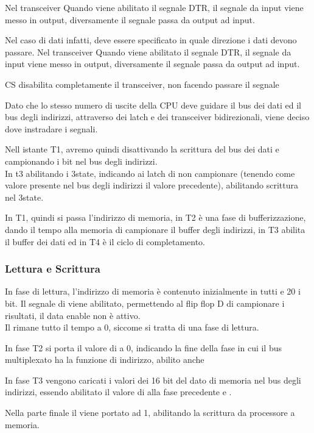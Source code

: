 \documentclass[../template]{subfiles}
\begin{document}
Nel transceiver Quando viene abilitato il segnale DTR, il segnale da input viene messo in output, diversamente il segnale passa da output ad input.

Nel caso di dati infatti, deve essere specificato in quale direzione i dati devono passare.
Nel transceiver Quando viene abilitato il segnale DTR, il segnale da input viene messo in output, diversamente il segnale passa da output ad input.

CS disabilita completamente il transceiver, non facendo passare il segnale

Dato che lo stesso numero di uscite della CPU deve guidare il bus dei dati ed il bus degli indirizzi, attraverso dei latch e dei transceiver bidirezionali, viene deciso dove instradare i segnali.

Nell istante T1, avremo quindi  disattivando la scrittura del bus dei dati e  campionando i bit nel bus degli indirizzi.
\\
In t3  abilitando i 3state,  indicando ai latch di non campionare (tenendo come valore presente nel bus degli indirizzi il valore precedente),  abilitando scrittura nel 3state.

In T1, quindi si passa l'indirizzo di memoria, in T2 è una fase di bufferizzazione, dando il tempo alla memoria di campionare il buffer degli indirizzi, in T3 abilita il buffer dei dati ed in T4 è il ciclo di completamento.

\subsubsection{Lettura e Scrittura}
In fase di lettura, l'indirizzo di memoria è contenuto inizialmente in tutti e 20 i bit. Il segnale di  viene abilitato, permettendo al flip flop D di campionare i risultati, il data enable non è attivo.
\\
Il  rimane tutto il tempo a 0, siccome si tratta di una fase di lettura.

In fase T2 si porta il valore di  a 0, indicando la fine della fase in cui il bus multiplexato ha la funzione di indirizzo, abilito anche 

In fase T3 vengono caricati i valori dei 16 bit del dato di memoria nel bus degli indirizzi, essendo abilitato il valore di  alla fase precedente e .

Nella parte finale il  viene portato ad 1, abilitando la scrittura da processore a memoria.
\newpage
\end{document}
